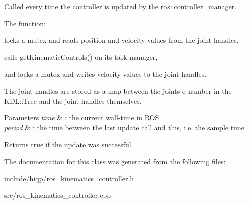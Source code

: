 Called every time the controller is updated by the ros\-::controller\-\_\-manager. 

The function\-: 
\begin{DoxyEnumerate}
\item locks a mutex and reads position and velocity values from the joint handles, 
\item calls get\-Kinematic\-Controls() on its task manager, 
\item and locks a mutex and writes velocity values to the joint handles. 
\end{DoxyEnumerate}The joint handles are stored as a map between the joints q-\/number in the K\-D\-L\-::\-Tree and the joint handles themselves.


\begin{DoxyParams}{Parameters}
{\em time} & \-: the current wall-\/time in R\-O\-S \\
\hline
{\em period} & \-: the time between the last update call and this, i.\-e. the sample time. \\
\hline
\end{DoxyParams}
\begin{DoxyReturn}{Returns}
true if the update was successful 
\end{DoxyReturn}


The documentation for this class was generated from the following files\-:\begin{DoxyCompactItemize}
\item 
include/hiqp/ros\-\_\-kinematics\-\_\-controller.\-h\item 
src/ros\-\_\-kinematics\-\_\-controller.\-cpp\end{DoxyCompactItemize}

